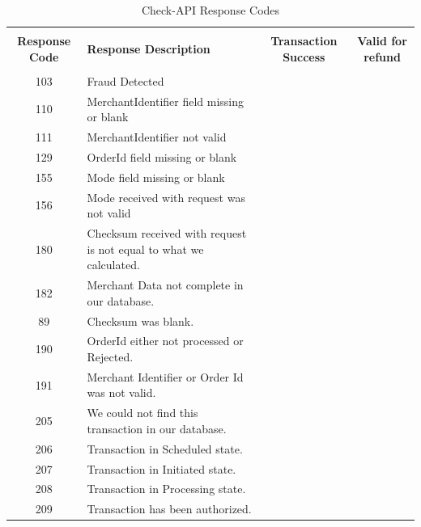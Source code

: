 \documentclass{article}
\newcommand{\xmark}{\ding{55}}
\begin{document}
\begin{longtable}{||c|p{7.5cm}||c||c||}
  \rowcolor{white}
  \caption{Check-API Response Codes}\\
   \rowcolor{green!50}
\bfseries{Response Code} & \bfseries{Response Description} &\bfseries{Transaction Success} &\bfseries{Valid for refund} \\ \hline & & & \\
103 &Fraud Detected& \textcolor{red} {\xmark} & \textcolor{red} {\xmark}  \\
110 &MerchantIdentifier field missing or blank& \textcolor{red} {\xmark} & \textcolor{red} {\xmark}  \\
111 &MerchantIdentifier not valid& \textcolor{red} {\xmark} & \textcolor{red} {\xmark}  \\
129 &OrderId field missing or blank& \textcolor{red} {\xmark} & \textcolor{red} {\xmark}  \\
155 &Mode field missing or blank& \textcolor{red} {\xmark} & \textcolor{red} {\xmark}  \\
156 &Mode received with request was not valid& \textcolor{red} {\xmark} & \textcolor{red} {\xmark}  \\
180 &Checksum received with request is not equal to what we calculated.& \textcolor{red} {\xmark} & \textcolor{red} {\xmark}  \\
182 &Merchant Data not complete in our database.& \textcolor{red} {\xmark} & \textcolor{red} {\xmark}  \\
89 &Checksum was blank.& \textcolor{red} {\xmark} & \textcolor{red} {\xmark}  \\
190 &OrderId either not processed or Rejected.& \textcolor{red} {\xmark} & \textcolor{red} {\xmark}  \\
191 &Merchant Identifier or Order Id was not valid.& \textcolor{red} {\xmark} & \textcolor{red} {\xmark}  \\
205 &We could not find this transaction in our database.& \textcolor{red} {\xmark} & \textcolor{red} {\xmark}  \\
206 &Transaction in Scheduled state.& \textcolor{red} {\xmark} & \textcolor{red} {\xmark}  \\
207 &Transaction in Initiated state.& \textcolor{red} {\xmark} & \textcolor{red} {\xmark}  \\
208 &Transaction in Processing state.& \textcolor{red} {\xmark} & \textcolor{red} {\xmark}  \\
209 &Transaction has been authorized.& \textcolor{red} {\xmark} & \textcolor{red} {\xmark}  \\

\end{longtable}
\end{document}
